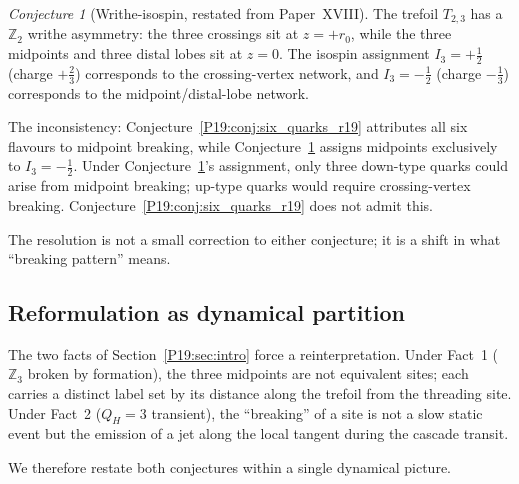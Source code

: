 \documentclass[11pt,a4paper]{article}
\theoremstyle{definition}\newtheorem{definition}[theorem]{Definition}
\theoremstyle{remark}
\newtheorem{conjecture}[theorem]{Conjecture}
\newcommand{\QH}{Q_H}
\newcommand{\Ztwo}{\mathbb{Z}_2}
\newcommand{\Zthree}{\mathbb{Z}_3}
\begin{document}
\begin{conjecture}[Writhe-isospin, restated from Paper~XVIII]
\label{P19:conj:isospin_r19}
The trefoil $T_{2,3}$ has a $\Ztwo$ writhe asymmetry: the three
crossings sit at $z=+r_0$, while the three midpoints and three
distal lobes sit at $z=0$.  The isospin assignment $I_3=+\tfrac12$
(charge $+\tfrac23$) corresponds to the crossing-vertex network,
and $I_3=-\tfrac12$ (charge $-\tfrac13$) corresponds to the
midpoint/distal-lobe network.
\end{conjecture}

The inconsistency: Conjecture~\ref{P19:conj:six_quarks_r19} attributes
all six flavours to midpoint breaking, while
Conjecture~\ref{P19:conj:isospin_r19} assigns midpoints exclusively to
$I_3=-\tfrac12$.  Under Conjecture~\ref{P19:conj:isospin_r19}'s
assignment, only three down-type quarks could arise from midpoint
breaking; up-type quarks would require crossing-vertex breaking.
Conjecture~\ref{P19:conj:six_quarks_r19} does not admit this.

The resolution is not a small correction to either conjecture; it
is a shift in what ``breaking pattern'' means.

\subsection{Reformulation as dynamical partition}

The two facts of Section~\ref{P19:sec:intro} force a reinterpretation.
Under Fact~1 ($\Zthree$ broken by formation), the three midpoints
are not equivalent sites; each carries a distinct label set by its
distance along the trefoil from the threading site.  Under Fact~2
($\QH=3$ transient), the ``breaking'' of a site is not a slow
static event but the emission of a jet along the local tangent
during the cascade transit.

We therefore restate both conjectures within a single dynamical
picture.
\end{document}
